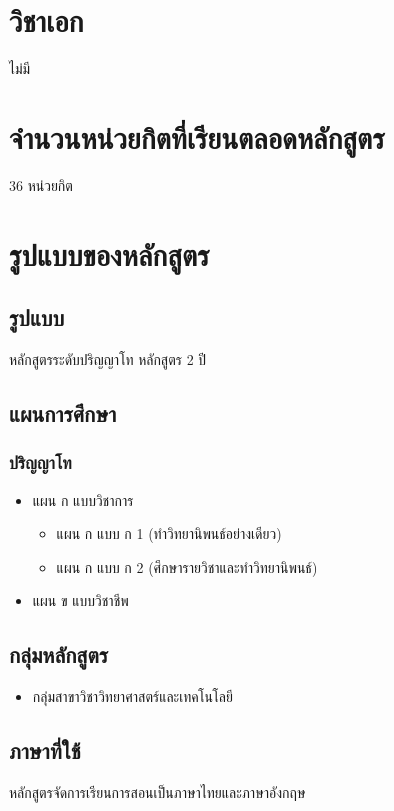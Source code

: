 \section{วิชาเอก}
ไม่มี

\section{จำนวนหน่วยกิตที่เรียนตลอดหลักสูตร}
36 หน่วยกิต

\section{รูปแบบของหลักสูตร}

\subsection{รูปแบบ}
หลักสูตรระดับปริญญาโท หลักสูตร 2 ปี

\subsection{แผนการศึกษา}
\subsubsection*{ปริญญาโท}
\begin{itemize}
	\item แผน ก แบบวิชาการ
		\begin{itemize}
		\item แผน ก แบบ ก 1 (ทำวิทยานิพนธ์อย่างเดียว)
		\item แผน ก แบบ ก 2 (ศึกษารายวิชาและทำวิทยานิพนธ์)
		\end{itemize}
	\item แผน ข แบบวิชาชีพ
\end{itemize}

\subsection{กลุ่มหลักสูตร}
\begin{itemize}
	\item กลุ่มสาขาวิชาวิทยาศาสตร์และเทคโนโลยี
\end{itemize}


\subsection{ภาษาที่ใช้}
หลักสูตรจัดการเรียนการสอนเป็นภาษาไทยและภาษาอังกฤษ

